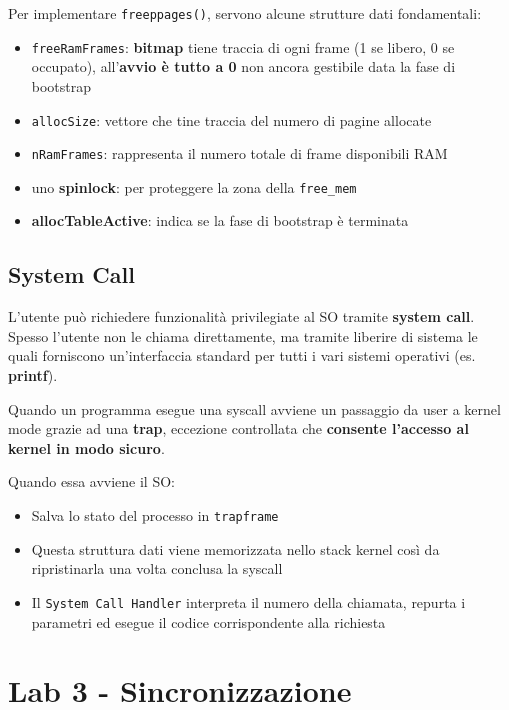 Per implementare \verb|freeppages()|, servono alcune strutture dati fondamentali:

\begin{itemize}
  \item \verb|freeRamFrames|: \textbf{bitmap} tiene traccia di ogni frame (1 se libero, 0 se occupato), all'\textbf{avvio è tutto a 0} non ancora gestibile data la fase di bootstrap
  \item \verb|allocSize|: vettore che tine traccia del numero di pagine allocate
  \item \verb|nRamFrames|: rappresenta il numero totale di frame disponibili RAM
  \item uno \textbf{spinlock}: per proteggere la zona della \verb|free_mem|
  \item \textbf{allocTableActive}: indica se la fase di bootstrap è terminata
\end{itemize}

\subsection{System Call}

L'utente può richiedere funzionalità privilegiate al SO tramite \textbf{system call}.
Spesso l'utente non le chiama direttamente, ma tramite liberire di sistema le quali
forniscono un'interfaccia standard per tutti i vari sistemi operativi (es. \textbf{printf}).

Quando un programma esegue una syscall avviene un passaggio da user a kernel mode grazie ad una \textbf{trap},
eccezione controllata che \textbf{consente l'accesso al kernel in modo sicuro}.

Quando essa avviene il SO:

\begin{itemize}
  \item Salva lo stato del processo in \verb|trapframe|
  \item Questa struttura dati viene memorizzata nello stack kernel così da ripristinarla una volta conclusa la syscall
  \item Il \verb|System Call Handler| interpreta il numero della chiamata, repurta i parametri ed esegue il codice corrispondente alla richiesta
\end{itemize}

\section{Lab 3 - Sincronizzazione}

